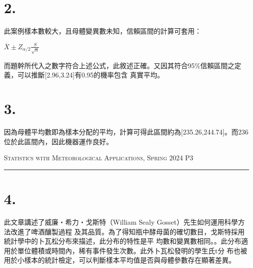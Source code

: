 \documentclass{article}
\begin{document}
\begin{CJK*}{UTF8}{bsmi}
\section*{2.}
\begin{spacing}{2.5}
    \begin{large}
        此案例樣本數較大，且母體變異數未知，信賴區間的計算可套用：\\
        \begin{center}
            $\overline{X}\pm Z_{\alpha/2} \frac{S}{\sqrt{n}}$
        \end{center}
        而題幹所代入之數字符合上述公式，此敘述正確。又因其符合95\%信賴區間之定義，可以推斷[2.96,3.24]有0.95的機率包含
        真實平均。
    \end{large}
\end{spacing}

\section*{3.}
\begin{spacing}{2.5}
    \begin{large}
        因為母體平均數即為樣本分配的平均，計算可得此區間約為[235.26,244.74]。而236位於此區間內，因此機器運作良好。
    \end{large}
\end{spacing}

        
\newpage
\thispagestyle{empty}
\hfill {\scshape \large Statistics with Meteorological Applications, Spring 2024} \hfill {\scshape P3}
\smallskip
\hrule    
\bigskip
\bigskip
\bigskip

\section*{4.}
\begin{spacing}{2.5}
    \begin{large}
        此文章講述了威廉‧希力‧戈斯特（William Sealy Gosset）先生如何運用科學方法改進了啤酒釀製過程
        及其品質。為了得知瓶中酵母菌的確切數目，戈斯特採用統計學中的卜瓦松分布來描述，此分布的特性是平
        均數和變異數相同。。此分布適用於單位體積或時間內，稀有事件發生次數。此外卜瓦松發明的學生氏t分
        布也被用於小樣本的統計檢定，可以判斷樣本平均值是否與母體參數存在顯著差異。
    \end{large}
\end{spacing}

\end{CJK*}
\end{document}
